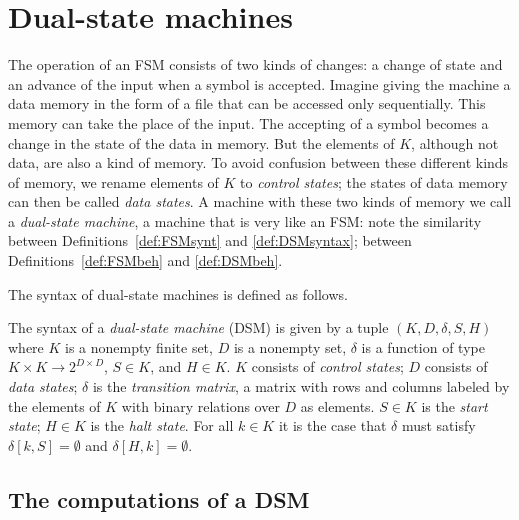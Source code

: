 \documentclass[preprint,11pt]{elsarticle}
\begin{document}
\section{Dual-state machines}
\label{sec:DSM}
The operation of an FSM consists of two
kinds of changes: a change of state and an advance of the
input when a symbol is accepted.
Imagine giving the machine a data memory in the form
of a file that can be accessed only sequentially.
This memory can take the place of the input.
The accepting of a symbol becomes a change
in the state of the data in memory.
But the elements of $K$,
although not data, are also a kind of memory.
To avoid confusion between these different kinds of memory,
we rename elements of $K$ to \emph{control states};
the states of data memory can then be called \emph{data states}.
A machine with these two kinds of memory
we call a \emph{dual-state machine},
a machine that is very like an FSM:
note the similarity between
Definitions~\ref{def:FSMsynt}
and \ref{def:DSMsyntax};
between
Definitions~\ref{def:FSMbeh}
and \ref{def:DSMbeh}.

The syntax of dual-state machines is defined as follows.
\begin{definition}\label{def:DSMsyntax}
The syntax of a \emph{dual-state machine} (DSM)
is given by a tuple $(K,D,\delta,S,H)$
where $K$ is a nonempty finite set,
$D$ is a nonempty set,
$\delta$ is a function of type
$K \times K \to 2^{D \times D}$,
$S \in K$, and
$H \in K$.
$K$ consists of \emph{control states};
$D$ consists of \emph{data states};
$\delta$ is the \emph{transition matrix},
a matrix with rows and columns labeled by the elements of $K$
with binary relations over $D$ as elements.
$S \in K$ is the \emph{start state};
$H \in K$ is the \emph{halt state}.
For all $k \in K$ it is the case that $\delta$
must satisfy $\delta[k,S] = \emptyset$
and $\delta[H,k] = \emptyset$.
\end{definition}

\subsection{The computations of a DSM}
\label{sec:exec}
\end{document}
